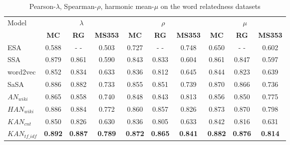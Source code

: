 \renewcommand\arraystretch{1.3}
\begin{table}
    \center
    \begin{tabular}{l|c|c|c|c|c|c|c|c|c}
    \hline
    \multirow{2}{*}{Model} & \multicolumn{3}{c|}{$\lambda$}     & \multicolumn{3}{c|}{$\rho$}          & \multicolumn{3}{c}{$\mu$} \\ \cline{2-10} 
                           & \textbf{MC}&\textbf{RG}&\textbf{MS353} & \textbf{MC}&\textbf{RG}&\textbf{MS353} & \textbf{MC}&\textbf{RG}&\textbf{MS353}\\ \hline
    ESA                    & 0.588 &  - -  & 0.503 & 0.727 &  - -   & 0.748 & 0.650 &  - -   & 0.602   \\ \hline
    SSA                    & 0.879 & 0.861 & 0.590 & 0.843 & 0.833 & 0.604 & 0.861 & 0.847 & 0.597   \\ \hline
    word2vec               & 0.852 & 0.834 & 0.633 & 0.836 & 0.812 & 0.645 & 0.844 & 0.823 & 0.639   \\ \hline
    SaSA                   & 0.886 & 0.882 & 0.733 & 0.855 & 0.851 & 0.739 & 0.870 & 0.866 & 0.736   \\ \hline
    $AN_{wiki}$            & 0.865 & 0.858 & 0.740 & 0.848 & 0.843 & 0.813 & 0.856 & 0.850 & 0.775   \\ \hline
    $HAN_{wiki}$           & 0.886 & 0.884 & 0.772 & 0.860 & 0.857 & 0.826 & 0.873 & 0.870 & 0.798   \\ \hline
    $KAN_{cnt}$       & 0.850 & 0.826 & 0.630 & 0.836 & 0.805 & 0.633 & 0.842 & 0.816 & 0.631   \\ \hline
    $KAN_{tf\_idf}$         & \textbf{0.892} & \textbf{0.887} & \textbf{0.789} & \textbf{0.872} & \textbf{0.865} & \textbf{0.841} & \textbf{0.882} & \textbf{0.876} & \textbf{0.814} \\ \hline
    \end{tabular}
    \caption{Pearson-$\lambda$, Spearman-$\rho$, harmonic mean-$\mu$ on the word relatedness datasets}
    \label{srresult}
\end{table}


